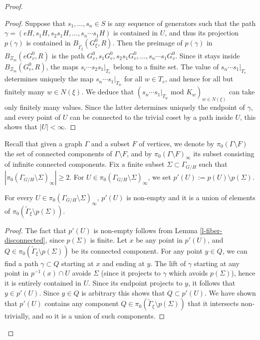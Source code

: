 \documentclass[10pt,a4paper]{amsart}
\newcommand{\Gammatilde}{\ensuremath{\widetilde{\Gamma}}}%
\begin{document}
\begin{proof}
\begin{proof}
Suppose that $s_1, \ldots, s_n\in S$ is any sequence of generators such that the path $\gamma=(eH, s_1H, s_2s_1H, \ldots, s_n\cdots s_1H)$ is contained in $U$, and thus its projection $p(\gamma)$ is contained in $B_{\Gammatilde_\xi}(G^0_\xi, R)$. 
Then the preimage of $p(\gamma)$ in $B_{\Xi_m}(eG^0_v, R)$ is the path 
$G^0_v, s_1G^0_v, s_2s_1G^0_v , \ldots, s_n\cdots s_1G^0_v$. Since it stays inside $B_{\Xi_m}(G^0_v, R)$, the maps $s_i\cdots s_2s_1|_{T_v}$ belong to a finite set.  The value of $s_n\cdots s_1\vert_{T_v}$ determines uniquely the map $s_n\cdots s_1|_{T_w}$ for all $w\in T_v$, and hence for all but finitely many $w\in N(\xi)$. We deduce that  $(s_n\cdots s_1|_{T_w}\text{ mod }K_w)_{w\in N(\xi)}$ can take only finitely many values. Since the latter determines uniquely the endpoint of $\gamma$, and every point of $U$ can be connected to the trivial coset by a path inside $U$, this shows that $|U|<\infty$.  \qedhere
\end{proof}

Recall that given a graph $\Gamma$ and a subset $F$ of vertices, we denote by $\pi_0(\Gamma\setminus F)$ the set of connected components of $\Gamma\setminus F$, and by $\pi_0(\Gamma\setminus F)_\infty$ its subset consisting of infinite connected components. Fix a finite subset $\Sigma\subset\Gamma_{G/H}$ such that $|\pi_0(\Gamma_{G/H}\setminus\Sigma)_\infty|\ge 2$.  For $U\in \pi_0(\Gamma_{G/H}\setminus\Sigma)_\infty$, we set $p'(U):=p(U)\setminus p(\Sigma)$.

\begin{lemma}\label{l-projection-union-cc}

For every $U\in \pi_0(\Gamma_{G/H}\setminus\Sigma)_\infty$, $p'(U)$ is non-empty and it is a union of elements of $\pi_0(\Gammatilde_\xi\setminus p(\Sigma))$.
    
\end{lemma}
\begin{proof}
    The fact that $p'(U)$ is non-empty follows from Lemma \ref{l-fiber-disconnected}, since $p(\Sigma)$ is finite. Let $x$ be any point in $p'(U)$, and $Q\in \pi_0(\Gammatilde_\xi\setminus p(\Sigma))$ be its connected component. For any point $y\in Q$, we can find a path $\gamma\subset Q$ starting at $x$ and ending at $y$. The lift of $\gamma$ starting at any point in $p^{-1}(x)\cap U$ avoids $\Sigma$ (since it projects to $\gamma$ which avoids $p(\Sigma)$), hence it is entirely contained in $U$. Since its endpoint projects to $y$, it follows that $y\in p'(U)$. Since $y\in Q$ is arbitrary this shows that $Q\subset p'(U)$. We have shown that $p'(U)$ contains any component  $Q\in \pi_0(\Gammatilde_\xi\setminus p(\Sigma))$ that it intersects non-trivially, and so it is a union of such components. \qedhere



\end{proof}
\end{proof}
\end{document}
